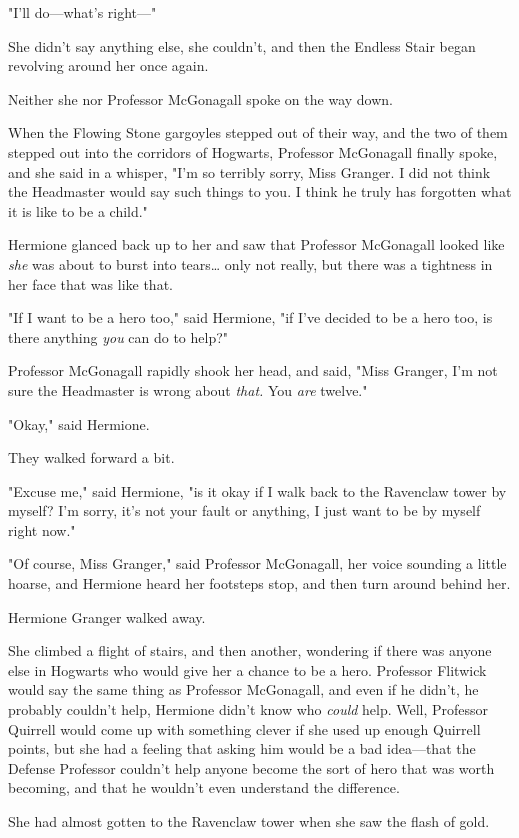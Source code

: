 "I'll do---what's right---"

She didn't say anything else, she couldn't, and then the Endless Stair began 
revolving around her once again.

Neither she nor Professor McGonagall spoke on the way down.

When the Flowing Stone gargoyles stepped out of their way, and the two of them 
stepped out into the corridors of Hogwarts, Professor McGonagall finally spoke, 
and she said in a whisper, "I'm so terribly sorry, Miss Granger. I did not 
think the Headmaster would say such things to you. I think he truly has 
forgotten what it is like to be a child."

Hermione glanced back up to her and saw that Professor McGonagall looked like 
\emph{she} was about to burst into tears{\ldots} only not really, but there was 
a tightness in her face that was like that.

"If I want to be a hero too," said Hermione, "if I've decided to be a hero too, 
is there anything \emph{you} can do to help?"

Professor McGonagall rapidly shook her head, and said, "Miss Granger, I'm not 
sure the Headmaster is wrong about \emph{that.} You \emph{are} twelve."

"Okay," said Hermione.

They walked forward a bit.

"Excuse me," said Hermione, "is it okay if I walk back to the Ravenclaw tower 
by myself? I'm sorry, it's not your fault or anything, I just want to be by 
myself right now."

"Of course, Miss Granger," said Professor McGonagall, her voice sounding a 
little hoarse, and Hermione heard her footsteps stop, and then turn around 
behind her.

Hermione Granger walked away.

She climbed a flight of stairs, and then another, wondering if there was anyone 
else in Hogwarts who would give her a chance to be a hero. Professor Flitwick 
would say the same thing as Professor McGonagall, and even if he didn't, he 
probably couldn't help, Hermione didn't know who \emph{could} help. Well, 
Professor Quirrell would come up with something clever if she used up enough 
Quirrell points, but she had a feeling that asking him would be a bad 
idea---that the Defense Professor couldn't help anyone become the sort of hero 
that was worth becoming, and that he wouldn't even understand the difference.

She had almost gotten to the Ravenclaw tower when she saw the flash of gold.